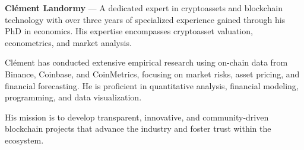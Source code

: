 \documentclass{article}
\begin{document}
\begin{tcolorbox}[colback=headerColor!10!white, colframe=headerColor, boxrule=0.8mm, width=\textwidth]
\textbf{Clément Landormy} — A dedicated expert in cryptoassets and blockchain technology with over three years of specialized experience gained through his PhD in economics. His expertise encompasses cryptoasset valuation, econometrics, and market analysis.

Clément has conducted extensive empirical research using on-chain data from Binance, Coinbase, and CoinMetrics, focusing on market risks, asset pricing, and financial forecasting. He is proficient in quantitative analysis, financial modeling, programming, and data visualization.

His mission is to develop transparent, innovative, and community-driven blockchain projects that advance the industry and foster trust within the ecosystem.
\end{tcolorbox}

\vspace{1em}
\end{document}
